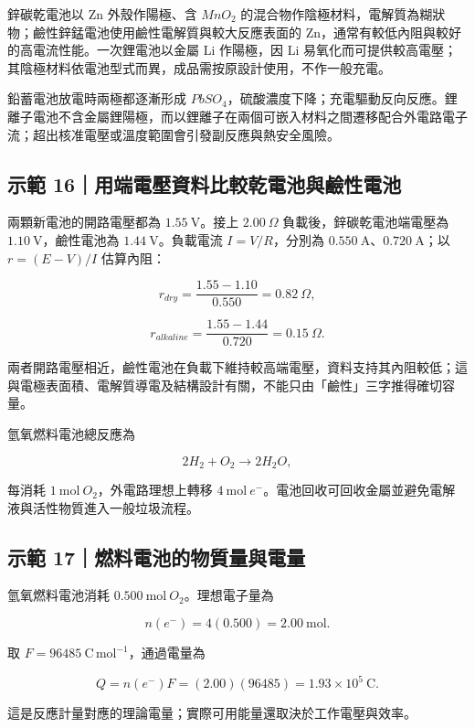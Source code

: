 \documentclass[11pt,a4paper]{article}
\begin{document}
鋅碳乾電池以 Zn 外殼作陽極、含 \(MnO_2\) 的混合物作陰極材料，電解質為糊狀物；鹼性鋅錳電池使用鹼性電解質與較大反應表面的 Zn，通常有較低內阻與較好的高電流性能。一次鋰電池以金屬 Li 作陽極，因 Li 易氧化而可提供較高電壓；其陰極材料依電池型式而異，成品需按原設計使用，不作一般充電。

鉛蓄電池放電時兩極都逐漸形成 \(PbSO_4\)，硫酸濃度下降；充電驅動反向反應。鋰離子電池不含金屬鋰陽極，而以鋰離子在兩個可嵌入材料之間遷移配合外電路電子流；超出核准電壓或溫度範圍會引發副反應與熱安全風險。

\begin{HandoutWorkedExample}

\subsection{示範 16｜用端電壓資料比較乾電池與鹼性電池}\label{ux793aux7bc4-16ux7528ux7aefux96fbux58d3ux8cc7ux6599ux6bd4ux8f03ux4e7eux96fbux6c60ux8207ux9e7cux6027ux96fbux6c60}

兩顆新電池的開路電壓都為 \(1.55\ \mathrm V\)。接上 \(2.00\ \Omega\) 負載後，鋅碳乾電池端電壓為 \(1.10\ \mathrm V\)，鹼性電池為 \(1.44\ \mathrm V\)。負載電流 \(I=V/R\)，分別為 \(0.550\ \mathrm A\)、\(0.720\ \mathrm A\)；以 \(r=(E-V)/I\) 估算內阻：

\[
r_{dry}=\frac{1.55-1.10}{0.550}=0.82\ \Omega,
\]

\[
r_{alkaline}=\frac{1.55-1.44}{0.720}=0.15\ \Omega.
\]

兩者開路電壓相近，鹼性電池在負載下維持較高端電壓，資料支持其內阻較低；這與電極表面積、電解質導電及結構設計有關，不能只由「鹼性」三字推得確切容量。

\end{HandoutWorkedExample}

氫氧燃料電池總反應為

\[
2H_2+O_2\rightarrow2H_2O,
\]

每消耗 \(1\ \mathrm{mol}\ O_2\)，外電路理想上轉移 \(4\ \mathrm{mol}\ e^-\)。電池回收可回收金屬並避免電解液與活性物質進入一般垃圾流程。

\begin{HandoutWorkedExample}

\subsection{示範 17｜燃料電池的物質量與電量}\label{ux793aux7bc4-17ux71c3ux6599ux96fbux6c60ux7684ux7269ux8ceaux91cfux8207ux96fbux91cf}

氫氧燃料電池消耗 \(0.500\ \mathrm{mol}\ O_2\)。理想電子量為

\[
n(e^-)=4(0.500)=2.00\ \mathrm{mol}.
\]

取 \(F=96485\ \mathrm{C\,mol^{-1}}\)，通過電量為

\[
Q=n(e^-)F=(2.00)(96485)=1.93\times10^5\ \mathrm C.
\]

這是反應計量對應的理論電量；實際可用能量還取決於工作電壓與效率。

\end{HandoutWorkedExample}
\end{document}
